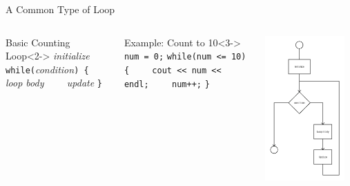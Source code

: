 \documentclass[]{beamer}
\begin{document}
\begin{frame}[fragile]{A Common Type of Loop}
\begin{columns}
    \begin{block}{Basic Counting Loop}<2->
    \textit{initialize}
    \newline\verb!while(!\textit{condition}\verb!) {!
    \newline\verb!    !\textit{loop body}
    \newline\verb!    !\textit{update}
    \newline\verb!}!
    \end{block}
   
    \begin{block}{Example: Count to 10}<3->
    \verb!num = 0;!
    \newline\verb!while(num <= 10) {!
    \newline\verb!    cout << num << endl;!
    \newline\verb!    num++;!
    \newline\verb!}!
    \end{block}

    \includegraphics[width=0.9\textwidth]{images/for}
\end{columns}
\end{frame}
\end{document}
